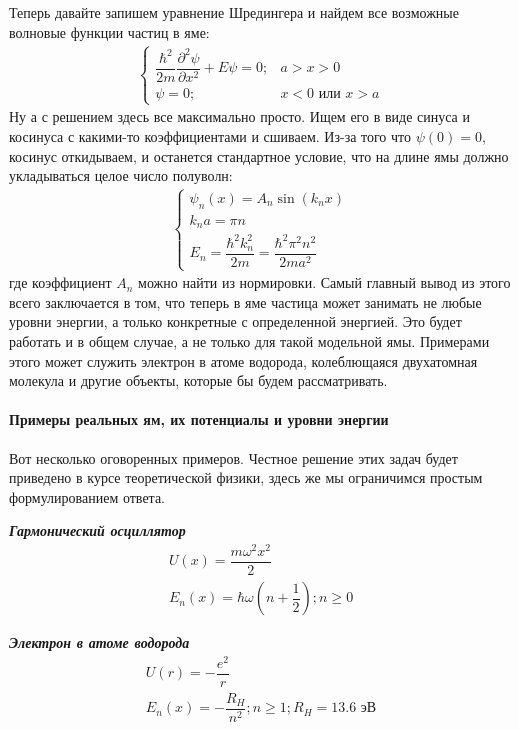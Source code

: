 \documentclass[12pt]{article}
\begin{document}
\vspace{1em} \noindent
Теперь давайте запишем уравнение Шредингера и найдем все возможные волновые функции частиц в яме:
\begin{gather*}
    \begin{cases}
         \dfrac{\hbar^2}{2m}\dfrac{\partial^2\psi}{\partial x^2} +  E\psi=0; &a>x>0  \\[10pt]
         \psi=0;  &x<0 \text{ или } x>a 
    \end{cases}
\end{gather*}
Ну а с решением здесь все максимально просто. Ищем его в виде синуса и косинуса с какими-то коэффициентами и сшиваем. Из-за того что $\psi(0) = 0$, косинус откидываем, и останется стандартное условие, что на длине ямы должно укладываться целое число полуволн:
\begin{gather}
\label{eq:sem_04_energy_in_hole}
    \begin{cases}
         \psi_n(x) = A_n \sin(k_nx)\\
         k_na = \pi n\\[5pt]
         E_n = \dfrac{\hbar^2k_n^2}{2m} = \dfrac{\hbar^2\pi^2n^2}{2ma^2}
    \end{cases}
\end{gather}
где коэффициент $A_n$ можно найти из нормировки. Самый главный вывод из этого всего заключается в том, что теперь в яме частица может занимать не любые уровни энергии, а только конкретные с определенной энергией. Это будет работать и в общем случае, а не только для такой модельной ямы. Примерами этого может служить электрон в атоме водорода, колеблющаяся двухатомная молекула и другие объекты, которые бы будем рассматривать.

\paragraph{Примеры реальных ям, их потенциалы и уровни энергии}
Вот несколько оговоренных примеров. Честное решение этих задач будет приведено в курсе теоретической физики, здесь же мы ограничимся простым формулированием ответа.

\vspace{3mm}
\noindent
\textit{\textbf{Гармонический осциллятор}} 
\begin{gather*}
    U(x) = \dfrac{m\omega^2x^2}{2}\\
    E_n(x) = \hbar\omega(n+\dfrac{1}{2}); n\ge 0
\end{gather*}

\noindent
\textit{\textbf{Электрон в атоме водорода}} 
\begin{gather*}
    U(r) = -\dfrac{e^2}{r}\\
    E_n(x) = -\dfrac{R_H}{n^2}; n\ge 1; R_H = 13.6 \text{ эВ} 
\end{gather*}
\end{document}
